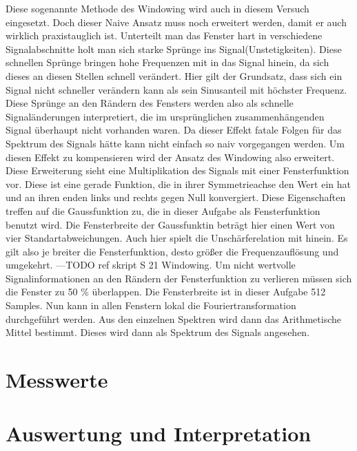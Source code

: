 Diese sogenannte Methode des Windowing wird auch in diesem Versuch eingesetzt. Doch dieser Naive Ansatz muss noch erweitert werden, damit er auch wirklich praxistauglich ist. Unterteilt man das Fenster hart in verschiedene Signalabschnitte holt man sich starke Sprünge ins Signal(Unstetigkeiten). Diese schnellen Sprünge bringen hohe Frequenzen mit in das Signal hinein, da sich dieses an diesen Stellen schnell verändert. Hier gilt der Grundsatz, dass sich ein Signal nicht schneller verändern kann als sein Sinusanteil mit höchster Frequenz.
Diese Sprünge an den Rändern des Fensters werden also als schnelle Signaländerungen interpretiert, die im ursprünglichen zusammenhängenden Signal überhaupt nicht vorhanden waren.
Da dieser Effekt fatale Folgen für das Spektrum des Signals hätte kann nicht einfach so naiv vorgegangen werden.
Um diesen Effekt zu kompensieren wird der Ansatz des Windowing also erweitert. Diese Erweiterung sieht eine Multiplikation des Signals mit einer Fensterfunktion vor. Diese ist eine gerade Funktion, die in ihrer Symmetrieachse den Wert ein hat und an ihren enden links und rechts gegen Null konvergiert. Diese Eigenschaften treffen auf die Gaussfunktion zu, die in dieser Aufgabe als Fensterfunktion benutzt wird. Die Fensterbreite der Gaussfunktin beträgt hier einen Wert von vier Standartabweichungen.
Auch hier spielt die Unschärferelation mit hinein. Es gilt also je breiter die Fensterfunktion, desto größer die Frequenzauflösung und umgekehrt. ---TODO ref skript S 21 Windowing. Um nicht wertvolle Signalinformationen an den Rändern der Fensterfunktion zu verlieren müssen sich die Fenster zu 50 \% überlappen. Die Fensterbreite ist in dieser Aufgabe 512 Samples. 
Nun kann in allen Fenstern lokal die Fouriertransformation durchgeführt werden. Aus den einzelnen Spektren wird dann das Arithmetische Mittel bestimmt. Dieses wird dann als Spektrum des Signals angesehen. 


\newpage
\section{Messwerte}
\label{chap:VERSUCH_1_MESSWERTE}


\section{Auswertung und Interpretation}
\label{chap:VERSUCH_1_AUSWERTUNG}
